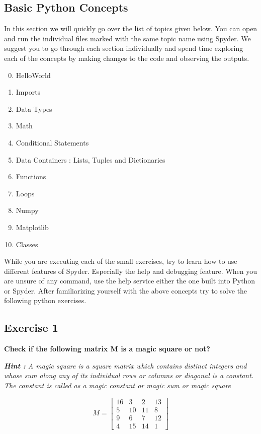 \documentclass{cmc}
\begin{document}
\subsection{Basic Python Concepts}

In this section we will quickly go over the list of topics given
below.  You can open and run the individual files marked with the same
topic name using Spyder.  We suggest you to go through each section
individually and spend time exploring each of the concepts by making
changes to the code and observing the outputs.

\begin{enumerate}
  \setcounter{enumi}{-1}
\item HelloWorld
\item Imports
\item Data Types
\item Math
\item Conditional Statements
\item Data Containers : Lists, Tuples and Dictionaries
\item Functions
\item Loops
\item Numpy
\item Matplotlib
\item Classes
\end{enumerate}

While you are executing each of the small exercises, try to learn how
to use different features of Spyder. Especially the help and debugging
feature.  When you are unsure of any command, use the help service
either the one built into Python or Spyder.  After familiarizing
yourself with the above concepts try to solve the following python
exercises.

\newpage
\subsection{Exercise 1}
\textbf{Check if the following matrix M is a magic square or not?}

\textit{\textbf{Hint : } A magic square is a square matrix which
  contains distinct integers and whose sum along any of its individual
  rows or columns or diagonal is a constant.  The constant is called
  as a magic constant or magic sum or magic square}

\begin{equation*}
  \label{eq:1}
  M =
  \begin{bmatrix}
    16 & 3  & 2  & 13 \\
    5  & 10 & 11 & 8  \\
    9  & 6  & 7  & 12 \\
    4 & 15 & 14 & 1
  \end{bmatrix}
\end{equation*}
\end{document}

